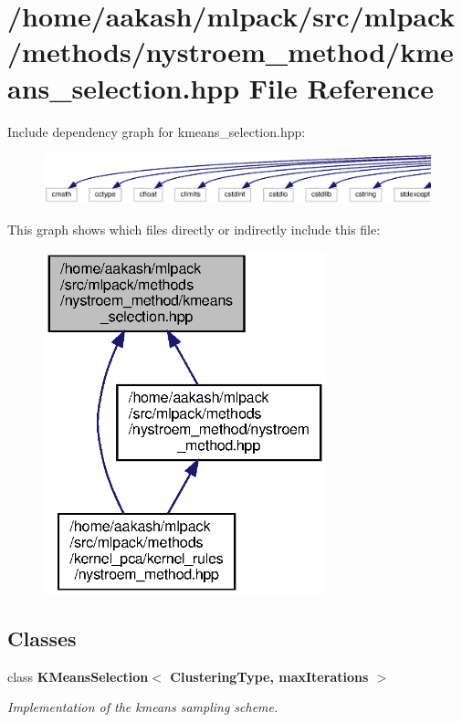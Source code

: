 \section{/home/aakash/mlpack/src/mlpack/methods/nystroem\+\_\+method/kmeans\+\_\+selection.hpp File Reference}
\label{kmeans__selection_8hpp}
Include dependency graph for kmeans\+\_\+selection.\+hpp\+:
\nopagebreak
\begin{figure}[H]
\begin{center}
\leavevmode
\includegraphics[width=350pt]{kmeans__selection_8hpp__incl}
\end{center}
\end{figure}
This graph shows which files directly or indirectly include this file\+:
\nopagebreak
\begin{figure}[H]
\begin{center}
\leavevmode
\includegraphics[width=232pt]{kmeans__selection_8hpp__dep__incl}
\end{center}
\end{figure}
\subsection*{Classes}
\begin{DoxyCompactItemize}
\item 
class \textbf{ K\+Means\+Selection$<$ Clustering\+Type, max\+Iterations $>$}
\begin{DoxyCompactList}\small\item\em Implementation of the kmeans sampling scheme. \end{DoxyCompactList}\end{DoxyCompactItemize}
